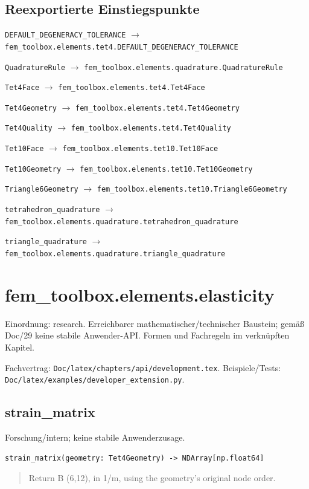 \subsection*{Reexportierte Einstiegspunkte}
\noindent\nolinkurl{DEFAULT_DEGENERACY_TOLERANCE} $\to$ \nolinkurl{fem_toolbox.elements.tet4.DEFAULT_DEGENERACY_TOLERANCE}\par
\noindent\nolinkurl{QuadratureRule} $\to$ \nolinkurl{fem_toolbox.elements.quadrature.QuadratureRule}\par
\noindent\nolinkurl{Tet4Face} $\to$ \nolinkurl{fem_toolbox.elements.tet4.Tet4Face}\par
\noindent\nolinkurl{Tet4Geometry} $\to$ \nolinkurl{fem_toolbox.elements.tet4.Tet4Geometry}\par
\noindent\nolinkurl{Tet4Quality} $\to$ \nolinkurl{fem_toolbox.elements.tet4.Tet4Quality}\par
\noindent\nolinkurl{Tet10Face} $\to$ \nolinkurl{fem_toolbox.elements.tet10.Tet10Face}\par
\noindent\nolinkurl{Tet10Geometry} $\to$ \nolinkurl{fem_toolbox.elements.tet10.Tet10Geometry}\par
\noindent\nolinkurl{Triangle6Geometry} $\to$ \nolinkurl{fem_toolbox.elements.tet10.Triangle6Geometry}\par
\noindent\nolinkurl{tetrahedron_quadrature} $\to$ \nolinkurl{fem_toolbox.elements.quadrature.tetrahedron_quadrature}\par
\noindent\nolinkurl{triangle_quadrature} $\to$ \nolinkurl{fem_toolbox.elements.quadrature.triangle_quadrature}\par
\section{fem\_toolbox.elements.elasticity}
Einordnung: research. Erreichbarer mathematischer/technischer Baustein; gemäß Doc/29 keine stabile Anwender-API. Formen und Fachregeln im verknüpften Kapitel.
\par Fachvertrag: \nolinkurl{Doc/latex/chapters/api/development.tex}. Beispiele/Tests:
\nolinkurl{Doc/latex/examples/developer_extension.py}.
\subsection{strain\_matrix}
Forschung/intern; keine stabile Anwenderzusage.
\begin{lstlisting}
strain_matrix(geometry: Tet4Geometry) -> NDArray[np.float64]
\end{lstlisting}
\begin{quote}
Return B (6,12), in 1/m, using the geometry's original node order.
\end{quote}
